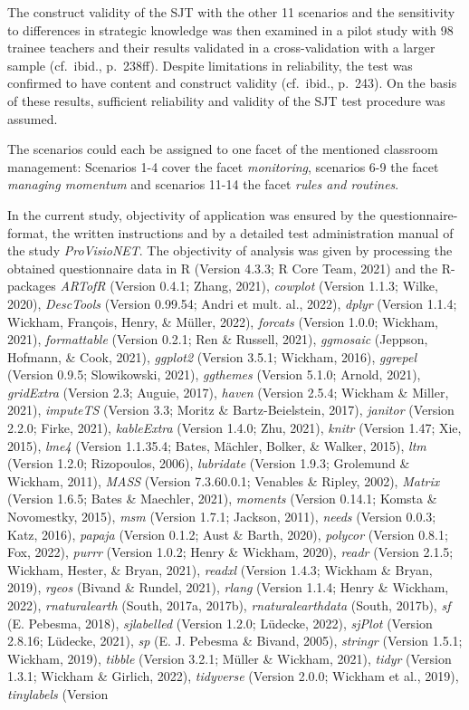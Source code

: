 \documentclass[
  man]{apa6}
\begin{document}
The construct validity of the SJT with the other 11 scenarios and the sensitivity to differences in strategic knowledge was then examined in a pilot study with 98 trainee teachers and their results validated in a cross-validation with a larger sample (cf.~ibid., p.~238ff). Despite limitations in reliability, the test was confirmed to have content and construct validity (cf.~ibid., p.~243). On the basis of these results, sufficient reliability and validity of the SJT test procedure was assumed.

The scenarios could each be assigned to one facet of the mentioned classroom management: Scenarios 1-4 cover the facet \emph{monitoring}, scenarios 6-9 the facet \emph{managing momentum} and scenarios 11-14 the facet \emph{rules and routines}.

In the current study, objectivity of application was ensured by the questionnaire-format, the written instructions and by a detailed test administration manual of the study \emph{ProVisioNET}. The objectivity of analysis was given by processing the obtained questionnaire data in R (Version 4.3.3; R Core Team, 2021) and the R-packages \emph{ARTofR} (Version 0.4.1; Zhang, 2021), \emph{cowplot} (Version 1.1.3; Wilke, 2020), \emph{DescTools} (Version 0.99.54; Andri et mult. al., 2022), \emph{dplyr} (Version 1.1.4; Wickham, François, Henry, \& Müller, 2022), \emph{forcats} (Version 1.0.0; Wickham, 2021), \emph{formattable} (Version 0.2.1; Ren \& Russell, 2021), \emph{ggmosaic} (Jeppson, Hofmann, \& Cook, 2021), \emph{ggplot2} (Version 3.5.1; Wickham, 2016), \emph{ggrepel} (Version 0.9.5; Slowikowski, 2021), \emph{ggthemes} (Version 5.1.0; Arnold, 2021), \emph{gridExtra} (Version 2.3; Auguie, 2017), \emph{haven} (Version 2.5.4; Wickham \& Miller, 2021), \emph{imputeTS} (Version 3.3; Moritz \& Bartz-Beielstein, 2017), \emph{janitor} (Version 2.2.0; Firke, 2021), \emph{kableExtra} (Version 1.4.0; Zhu, 2021), \emph{knitr} (Version 1.47; Xie, 2015), \emph{lme4} (Version 1.1.35.4; Bates, Mächler, Bolker, \& Walker, 2015), \emph{ltm} (Version 1.2.0; Rizopoulos, 2006), \emph{lubridate} (Version 1.9.3; Grolemund \& Wickham, 2011), \emph{MASS} (Version 7.3.60.0.1; Venables \& Ripley, 2002), \emph{Matrix} (Version 1.6.5; Bates \& Maechler, 2021), \emph{moments} (Version 0.14.1; Komsta \& Novomestky, 2015), \emph{msm} (Version 1.7.1; Jackson, 2011), \emph{needs} (Version 0.0.3; Katz, 2016), \emph{papaja} (Version 0.1.2; Aust \& Barth, 2020), \emph{polycor} (Version 0.8.1; Fox, 2022), \emph{purrr} (Version 1.0.2; Henry \& Wickham, 2020), \emph{readr} (Version 2.1.5; Wickham, Hester, \& Bryan, 2021), \emph{readxl} (Version 1.4.3; Wickham \& Bryan, 2019), \emph{rgeos} (Bivand \& Rundel, 2021), \emph{rlang} (Version 1.1.4; Henry \& Wickham, 2022), \emph{rnaturalearth} (South, 2017a, 2017b), \emph{rnaturalearthdata} (South, 2017b), \emph{sf} (E. Pebesma, 2018), \emph{sjlabelled} (Version 1.2.0; Lüdecke, 2022), \emph{sjPlot} (Version 2.8.16; Lüdecke, 2021), \emph{sp} (E. J. Pebesma \& Bivand, 2005), \emph{stringr} (Version 1.5.1; Wickham, 2019), \emph{tibble} (Version 3.2.1; Müller \& Wickham, 2021), \emph{tidyr} (Version 1.3.1; Wickham \& Girlich, 2022), \emph{tidyverse} (Version 2.0.0; Wickham et al., 2019), \emph{tinylabels} (Version 
\end{document}
